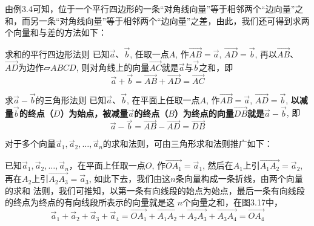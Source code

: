 由例3.4可知，位于一个平行四边形的一条“对角线向量”等于相邻两个“边向量”之和，而另一条“对角线向量”等于相邻两个“边向量”之差，由此，我们还可得到求两个向量和与差的方法如下：

\begin{blk}
   {求和的平行四边形法则} 已知$\vec{a}$、$\vec{b}$, 任取一点$A$, 作$\Vec{AB}=\vec{a}$, $\Vec{AD}=\vec{b}$, 再以$\Vec{AB}$、$\Vec{AD}$为边作$\parallelogram ABCD$, 则对角线上的向量$\Vec{AC}$就是$\vec{a}$与$\vec{b}$之和，即
   \[\vec{a}+\vec{b}=\Vec{AB}+\Vec{AD}=\Vec{AC}\] 
\end{blk}

\begin{blk}
    {求$\vec{a}-\vec{b}$的三角形法则} 已知$\vec{a}$、$\vec{b}$, 在平面上任取一点$A$, 作$\Vec{AB}=\vec{a}$, $\Vec{AD}=\vec{b}$, \textbf{以减量$\vec{b}$的终点（$D$）为始点，被减量$\vec{a}$的终点（$B$）为终点的向量$\Vec{DB}$就是$\vec{a}-\vec{b}$}, 即
    \[\vec{a}-\vec{b}=\Vec{AB}-\Vec{AD}=\Vec{DB}\] 
\end{blk}

对于多个向量$\vec{a}_1,\vec{a}_2,\ldots,\vec{a}_n$的求和法则，可由三角形求和法则推广如下：

已知$\vec{a}_1,\vec{a}_2,\ldots,\vec{a}_n$，在平面上任取一点$O$, 作$\Vec{OA_1}=\vec{a}_1$, 然后在$A_1$上引$\Vec{A_1A_2}=\vec{a}_2$, 再在$A_2$上引$\Vec{A_2A_3}=\vec{a}_3$, 如此下去，我们由这$n$条向量构成一条折线，由两个向量的求和
法则，我们可推知，以第一条有向线段的始点为始点，最后一条有向线段的终点为终点的有向线段所表示的向量就是这
$n$个向量之和，在图3.17中，
\[\vec{a}_1+\vec{a}_2+\vec{a}_3+\vec{a}_4=\Vec{OA_1}+\Vec{A_1A_2}+\Vec{A_2A_3}+\Vec{A_3A_4}=\Vec{OA_4}\]

